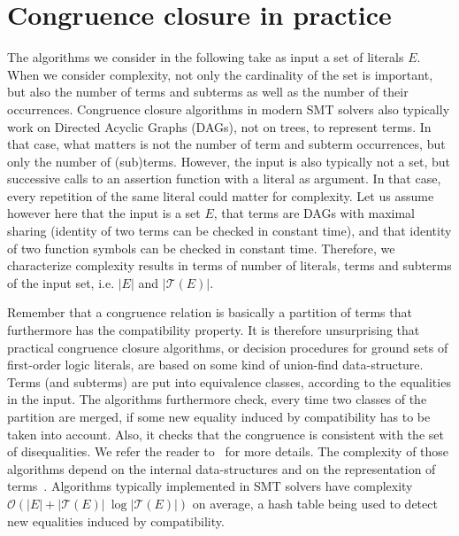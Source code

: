 \documentclass[smallextended]{svjour3}
\begin{document}
\section{Congruence closure in practice}

The algorithms we consider in the following take as input a set of literals $E$. %
When we consider complexity, not only the cardinality of the set is important, but also the number of terms and subterms as well as the number of their occurrences. 
Congruence closure algorithms in modern SMT solvers also typically work on Directed Acyclic Graphs (DAGs), not on trees, to represent terms. In that case, what matters is not the number of term and subterm occurrences, but only the number of (sub)terms. However, the input is also typically not a set, but successive calls to an assertion function with a literal as argument. In that case, every repetition of the
same literal could matter for complexity. 
Let us assume however here that the input is a set $E$, that terms are DAGs with maximal sharing (identity of two terms can be checked in constant time), and that identity of two function symbols can be checked in constant time. 
Therefore, we characterize complexity results in terms of number of literals, terms and subterms of the input set, i.e. $|E|$ and $|\mathcal{T}(E)|$.

Remember that a congruence relation is basically a partition of terms that
furthermore has the compatibility property.  It is therefore unsurprising that
practical congruence closure algorithms, or decision procedures for ground sets
of first-order logic literals, are based on some kind of union-find
data-structure.  Terms (and subterms) are put into equivalence classes,
according to the equalities in the input.  The algorithms furthermore check,
every time two classes of the partition are merged, if some new equality induced
by compatibility has to be taken into account.  Also, it checks that the
congruence is consistent with the set of disequalities.  We refer the reader
to~\cite{Nelson2,Downey1,Nieuwenhuis6} for more details.  The complexity of
those algorithms depend on the internal data-structures and on the
representation of terms~\cite{Downey1}.  Algorithms typically implemented in SMT
solvers have complexity $\mathcal{O}(|E| + |\mathcal{T}(E)|\ \log
|\mathcal{T}(E)|)$ on average, a hash table being used to detect new equalities
induced by compatibility.
\end{document}
